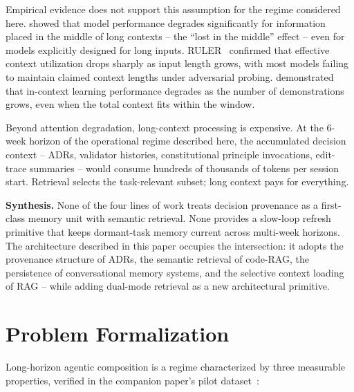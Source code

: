 \documentclass[11pt]{article}
\begin{document}
Empirical evidence does not support this assumption for the regime considered here.
\citet{liu2023lost} showed that model performance degrades significantly for information placed in the middle of long contexts -- the ``lost in the middle'' effect -- even for models explicitly designed for long inputs.
RULER~\citep{hsieh2024ruler} confirmed that effective context utilization drops sharply as input length grows, with most models failing to maintain claimed context lengths under adversarial probing.
\citet{li2024longcontextbench} demonstrated that in-context learning performance degrades as the number of demonstrations grows, even when the total context fits within the window.

Beyond attention degradation, long-context processing is expensive.
At the 6-week horizon of the operational regime described here, the accumulated decision context -- ADRs, validator histories, constitutional principle invocations, edit-trace summaries -- would consume hundreds of thousands of tokens per session start.
Retrieval selects the task-relevant subset; long context pays for everything.

\medskip

\noindent\textbf{Synthesis.}
None of the four lines of work treats decision provenance as a first-class memory unit with semantic retrieval.
None provides a slow-loop refresh primitive that keeps dormant-task memory current across multi-week horizons.
The architecture described in this paper occupies the intersection: it adopts the provenance structure of ADRs, the semantic retrieval of code-RAG, the persistence of conversational memory systems, and the selective context loading of RAG -- while adding dual-mode retrieval as a new architectural primitive.


\section{Problem Formalization}
\label{sec:problem}

Long-horizon agentic composition is a regime characterized by three measurable properties, verified in the companion paper's pilot dataset~\citep[\S3--4]{ovcharov2026recursive}:
\end{document}
